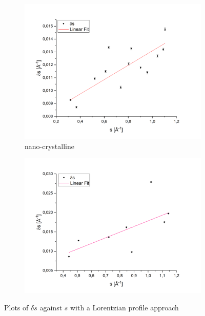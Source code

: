 \documentclass[12pt]{article}
\begin{document}
\begin{figure}[!ht]
    \begin{subfigure}{0.5\textwidth}
        \centering
        \includegraphics[width=\textwidth]{2_XRD/Graphics/Experiments/Lorentzian Broadening/LorentzianBroadening_CeO2_2.png}
        \caption{nano-crystalline }
    \end{subfigure}
    \begin{subfigure}{0.5\textwidth}
        \centering
        \includegraphics[width=\textwidth]{2_XRD/Graphics/Experiments/Lorentzian Broadening/LorentzianBroadening_Pd90Au10.png}
        \caption{}
    \end{subfigure}
    \caption{Plots of $\delta s$ against $s$ with a Lorentzian profile approach}
    \label{fig:LorentzianStrainSize}
\end{figure}
\FloatBarrier
\end{document}
